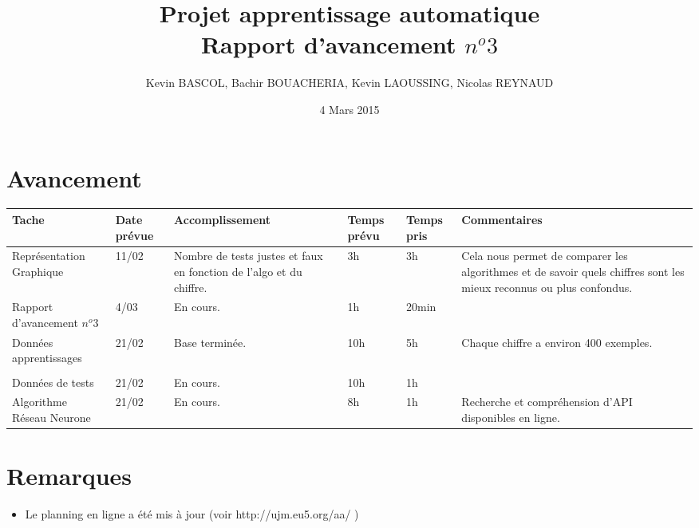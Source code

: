 \documentclass[10pt,a4paper, landscape]{report}
\author{Kevin BASCOL, Bachir BOUACHERIA, Kevin LAOUSSING, Nicolas REYNAUD}
\title{Projet apprentissage automatique\\Rapport d'avancement $n^o 3$}
\date{\vfill 4 Mars 2015}
\begin{document}
\maketitle

\section*{Avancement}
\begin{center}
	\bgroup
	\def\arraystretch{1.5}
	\begin{tabular}{|p{7cm}|p{1cm}|p{7cm}|p{2cm}|p{2cm}|p{7cm}|}
		\hline
		\rowcolor{gris}Tache & Date prévue & Accomplissement & Temps prévu & Temps pris & Commentaires\\
		\hline
		Représentation Graphique & 11/02 & Nombre de tests justes et faux en fonction de l'algo et du chiffre. & 3h & 3h & Cela nous permet de comparer les algorithmes et de savoir quels chiffres sont les mieux reconnus ou plus confondus. \\
		\hline
		Rapport d'avancement $n^o 3$ & 4/03 & En cours. & 1h & 20min & \\
		\hline
		Données apprentissages & 21/02 & Base terminée. & 10h & 5h & Chaque chiffre a environ 400 exemples.\\
		\hline
		\rowcolor{gris} & & & & & \\
		\hline
		Données de tests & 21/02 & En cours. & 10h & 1h & \\
		\hline
		Algorithme Réseau Neurone & 21/02 & En cours. & 8h & 1h & Recherche et compréhension d'API disponibles en ligne.\\
		\hline
	\end{tabular}
	\egroup
\end{center}

\section*{Remarques}
\begin{itemize}
\item Le planning en ligne a été mis à jour (voir http://ujm.eu5.org/aa/ )
\end{itemize}
\end{document}
